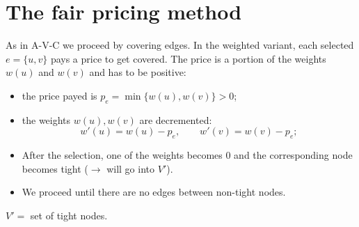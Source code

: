 \section{The fair pricing method}
As in A-V-C we proceed by covering edges. In the weighted variant, each selected $e=\{u,v\}$ pays a price to get covered. The price is a portion of the weights $w(u)$ and $w(v)$ and has to be positive:
\begin{itemize}
\item the price payed is $p_e=\min\{w(u),w(v)\}>0$;
\item the weights $w(u),w(v)$ are decremented:
\[w'(u)=w(u)-p_e,\qquad w'(v)=w(v)-p_e;\]
\item After the selection, one of the weights becomes $0$ and the corresponding node becomes tight ($\to$ will go into $V'$).
\item We proceed until there are no edges between non-tight nodes.
\end{itemize}
$V'=$ set of tight nodes.
